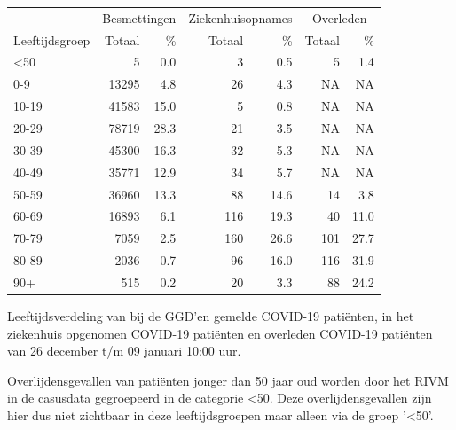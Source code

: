 \documentclass[
  english,
  man,floatsintext]{apa6}
\begin{document}
\begin{table}
\centering\begingroup\fontsize{11}{13}\selectfont

\begin{threeparttable}
\begin{tabular}{lrrrrrr}
\toprule
\multicolumn{1}{c}{ } & \multicolumn{2}{c}{Besmettingen} & \multicolumn{2}{c}{Ziekenhuisopnames} & \multicolumn{2}{c}{Overleden} \\
\cmidrule(l{3pt}r{3pt}){2-3} \cmidrule(l{3pt}r{3pt}){4-5} \cmidrule(l{3pt}r{3pt}){6-7}
Leeftijdsgroep & Totaal & \% & Totaal & \% & Totaal & \%\\
\midrule
<50 & 5 & 0.0 & 3 & 0.5 & 5 & 1.4\\
0-9 & 13295 & 4.8 & 26 & 4.3 & NA & NA\\
10-19 & 41583 & 15.0 & 5 & 0.8 & NA & NA\\
20-29 & 78719 & 28.3 & 21 & 3.5 & NA & NA\\
30-39 & 45300 & 16.3 & 32 & 5.3 & NA & NA\\
40-49 & 35771 & 12.9 & 34 & 5.7 & NA & NA\\
50-59 & 36960 & 13.3 & 88 & 14.6 & 14 & 3.8\\
60-69 & 16893 & 6.1 & 116 & 19.3 & 40 & 11.0\\
70-79 & 7059 & 2.5 & 160 & 26.6 & 101 & 27.7\\
80-89 & 2036 & 0.7 & 96 & 16.0 & 116 & 31.9\\
90+ & 515 & 0.2 & 20 & 3.3 & 88 & 24.2\\
\bottomrule
\end{tabular}
\begin{tablenotes}
\item[1] Leeftijdsverdeling van bij de GGD’en gemelde COVID-19 patiënten, in het ziekenhuis opgenomen COVID-19 patiënten en overleden COVID-19 patiënten van 26 december t/m 09 januari 10:00 uur.
\item[2] Overlijdensgevallen van patiënten jonger dan 50 jaar oud worden door het RIVM in de casusdata gegroepeerd in de categorie <50. Deze overlijdensgevallen zijn hier dus niet zichtbaar in deze leeftijdsgroepen maar alleen via de groep '<50'.
\end{tablenotes}
\end{threeparttable}
\endgroup{}
\end{table}

\newpage
\end{document}

